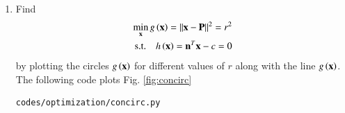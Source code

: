 \renewcommand{\theequation}{\theenumi}
\begin{enumerate}[label=\arabic*.,ref=\thesection.\theenumi]

\item
	\label{convex_code}
Find
\begin{align}
\label{eq:opt_line_nor_h}
	\min_{\mathbf{x}}g\left(\mathbf{x}\right) = \left\lVert\mathbf{x}-\mathbf{P}\right\rVert^2 = r^2 \\
\text{s.t.} \quad 	h\left(\mathbf{x}\right) = \mathbf{n}^T\mathbf{x} - c = 0\label{eq2_1_line}
\end{align}
by plotting the circles $g\left(\mathbf{x}\right)$
%
%
for different values of $r$ along with the line $g\left(\mathbf{x}\right)$.
%
%
\\
\solution 
The following code plots Fig. \ref{fig:concirc}	

%	
\begin{lstlisting}
codes/optimization/concirc.py
\end{lstlisting}


\end{enumerate}
